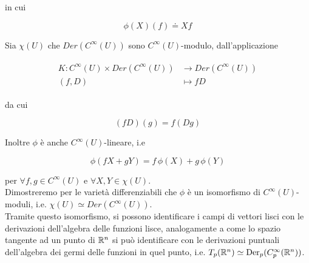 in cui

\begin{equation}
	\phi(X) (f) \doteq X f
\end{equation}

Sia $ \chi(U) $ che $ Der(C^{\infty}(U)) $ sono $ C^{\infty}(U) $-modulo, dall'applicazione

\begin{align}
	\begin{split}
		K : C^{\infty}(U) \times Der(C^{\infty}(U)) &\to Der(C^{\infty}(U))\\
		(f,D) &\mapsto f D
	\end{split}
\end{align}

da cui

\begin{equation}
	(f D) (g) = f (D g)
\end{equation}

Inoltre $ \phi $ è anche $ C^{\infty}(U) $-lineare, i.e

\begin{equation}
	\phi(f X + g Y) = f \, \phi(X) + g \, \phi(Y)
\end{equation}

per $ \forall f,g \in C^{\infty}(U) $ e $ \forall X,Y \in \chi(U) $.\\
Dimostreremo per le varietà differenziabili che $ \phi $ è un isomorfismo di $ C^{\infty}(U) $-moduli, i.e. $ \chi(U) \simeq Der(C^{\infty}(U)) $.\\
Tramite questo isomorfismo, si possono identificare i campi di vettori lisci con le derivazioni dell'algebra delle funzioni lisce, analogamente a come lo spazio tangente ad un punto di $ \mathbb{R}^{n} $ si può identificare con le derivazioni puntuali dell'algebra dei germi delle funzioni in quel punto, i.e. $ T_{p}(\mathbb{R}^{n}) \simeq \operatorname{Der}_{p}(C_{p}^{\infty}(\mathbb{R}^{n})) $.